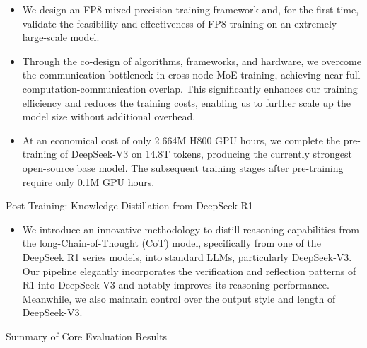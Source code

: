 \documentclass[11pt,a4paper]{article}
\begin{document}
\begin{itemize}
\item We design an FP8 mixed precision training framework and, for the first time, validate the feasibility and effectiveness of FP8 training on an extremely large-scale model.
\item Through the co-design of algorithms, frameworks, and hardware, we overcome the communication bottleneck in cross-node MoE training, achieving near-full computation-communication overlap. 
    This significantly enhances our training efficiency and reduces the training costs, enabling us to further scale up the model size without additional overhead.
\item At an economical cost of only 2.664M H800 GPU hours, we complete the pre-training of DeepSeek-V3 on 14.8T tokens, producing the currently strongest open-source base model. 
    The subsequent training stages after pre-training require only 0.1M GPU hours.
\end{itemize}

Post-Training: Knowledge Distillation from DeepSeek-R1

\begin{itemize}
\item We introduce an innovative methodology to distill reasoning capabilities from the long-Chain-of-Thought (CoT) model, specifically from one of the DeepSeek R1 series models, into standard LLMs, particularly DeepSeek-V3.
    Our pipeline elegantly incorporates the verification and reflection patterns of R1 into DeepSeek-V3 and notably improves its reasoning performance.
    Meanwhile, we also maintain control over the output style and length of DeepSeek-V3.
\end{itemize}

Summary of Core Evaluation Results
\end{document}

